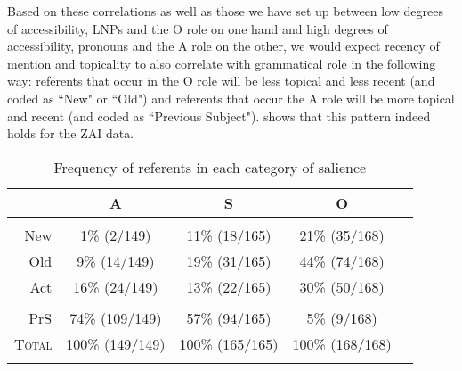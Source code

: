 Based on these correlations as well as those we have set up between low degrees of accessibility, LNPs and the O role on one hand and high degrees of accessibility, pronouns and the A role on the other, we would expect recency of mention and topicality to also correlate with grammatical role in the following way: referents that occur in the O role will be less topical and less recent (and coded as ``New" or ``Old") and referents that occur the A role will be more topical and recent (and coded as ``Previous Subject").  shows that this pattern indeed holds for the ZAI data.
\begin{table}

\caption{{Frequency of referents in each category of salience}}
\begin{tabular}{| r  c  c  c  c }
\lsptoprule
  & \textsc{A} & \textsc{S} & \textsc{O} \\

\midrule
 & & & \\
 New & 1{\%} (2/149) & 11{\%} (18/165) & 21{\%} (35/168)   \\

\midrule
 Old & 9{\%} (14/149) & 19{\%} (31/165) & 44{\%} (74/168)  \\

\midrule 
  Act & 16{\%} (24/149) & 13{\%} (22/165) & 30{\%} (50/168)  \\

\midrule
 & & & \\
 PrS & 74{\%} (109/149) & 57{\%} (94/165) & 5{\%} (9/168) \\

\midrule
 \textsc{Total} & 100{\%} (149/149)  & 100{\%} (165/165)  &  100{\%} (168/168)\\

\lspbottomrule
\end{tabular}\\
\label{totalsalience1}

\end{table}



